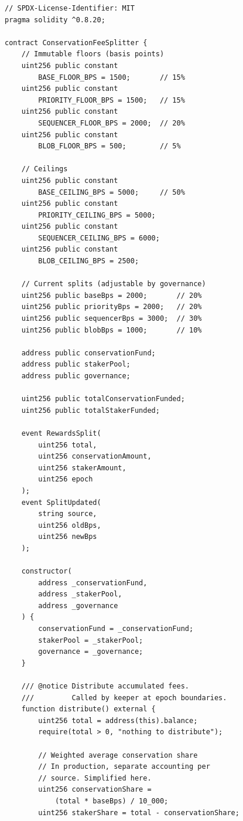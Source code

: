 \documentclass[11pt,letterpaper]{article}
\begin{document}
\begin{lstlisting}[language=Solidity,caption=ConservationFeeSplitter contract]
// SPDX-License-Identifier: MIT
pragma solidity ^0.8.20;

contract ConservationFeeSplitter {
    // Immutable floors (basis points)
    uint256 public constant
        BASE_FLOOR_BPS = 1500;       // 15%
    uint256 public constant
        PRIORITY_FLOOR_BPS = 1500;   // 15%
    uint256 public constant
        SEQUENCER_FLOOR_BPS = 2000;  // 20%
    uint256 public constant
        BLOB_FLOOR_BPS = 500;        // 5%

    // Ceilings
    uint256 public constant
        BASE_CEILING_BPS = 5000;     // 50%
    uint256 public constant
        PRIORITY_CEILING_BPS = 5000;
    uint256 public constant
        SEQUENCER_CEILING_BPS = 6000;
    uint256 public constant
        BLOB_CEILING_BPS = 2500;

    // Current splits (adjustable by governance)
    uint256 public baseBps = 2000;       // 20%
    uint256 public priorityBps = 2000;   // 20%
    uint256 public sequencerBps = 3000;  // 30%
    uint256 public blobBps = 1000;       // 10%

    address public conservationFund;
    address public stakerPool;
    address public governance;

    uint256 public totalConservationFunded;
    uint256 public totalStakerFunded;

    event RewardsSplit(
        uint256 total,
        uint256 conservationAmount,
        uint256 stakerAmount,
        uint256 epoch
    );
    event SplitUpdated(
        string source,
        uint256 oldBps,
        uint256 newBps
    );

    constructor(
        address _conservationFund,
        address _stakerPool,
        address _governance
    ) {
        conservationFund = _conservationFund;
        stakerPool = _stakerPool;
        governance = _governance;
    }

    /// @notice Distribute accumulated fees.
    ///         Called by keeper at epoch boundaries.
    function distribute() external {
        uint256 total = address(this).balance;
        require(total > 0, "nothing to distribute");

        // Weighted average conservation share
        // In production, separate accounting per
        // source. Simplified here.
        uint256 conservationShare =
            (total * baseBps) / 10_000;
        uint256 stakerShare = total - conservationShare;


\end{lstlisting}
\end{document}
